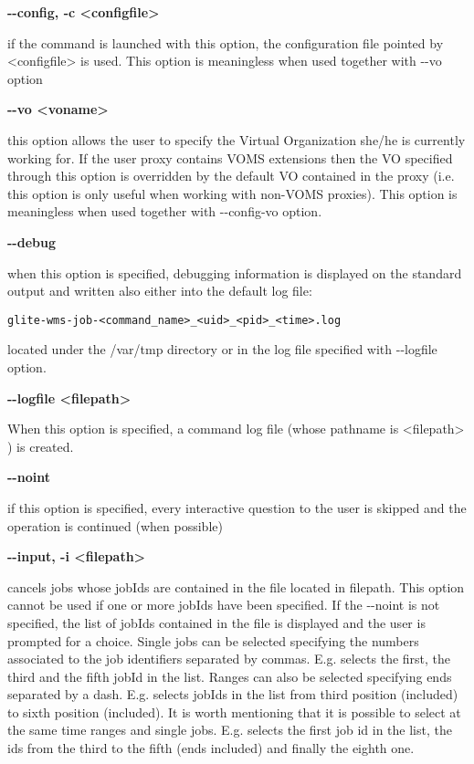\textbf{-{}-config, -c <configfile>}

if the command is launched with this option, the configuration file pointed by <configfile> is used. This option is meaningless when used together with -{}-vo option




\textbf{-{}-vo <voname>}

this option allows the user to specify the Virtual Organization she/he is currently working for.
If the user proxy contains VOMS extensions then the VO specified through this option is overridden by the
default VO contained in the proxy (i.e. this option is only useful when working with non-VOMS proxies).
This option is meaningless when used together with -{}-config-vo option.




\textbf{-{}-debug}

when this option is specified, debugging information is displayed on the standard output and written also either into the default log file:


\begin{verbatim}
glite-wms-job-<command_name>_<uid>_<pid>_<time>.log
\end{verbatim}

located under the /var/tmp  directory or in the log file specified with -{}-logfile option.




\textbf{-{}-logfile <filepath>}

When this option is specified, a command log file (whose pathname is <filepath> ) is created.



\textbf{-{}-noint  }

if this option is specified, every interactive question to the user is skipped and the 
operation is continued (when possible)




\textbf{-{}-input, -i <filepath>}

cancels jobs whose jobIds are contained in the file located in filepath. 
This option cannot be used if one or more jobIds have been specified. 
If the -{}-noint is not specified, the list of jobIds contained in the file is displayed and the 
user is prompted for a choice. Single jobs can be selected specifying the numbers associated to 
the job identifiers separated by commas. E.g. selects the first, the third and the fifth jobId in 
the list.
Ranges can also be selected specifying ends separated by a dash. E.g. selects jobIds in the 
list from third position (included) to sixth position (included).
It is worth mentioning that it is possible to select at the same time ranges and single jobs. 
E.g. selects the first job id in the list, the ids from the third to the fifth (ends included) 
and finally the eighth one.




